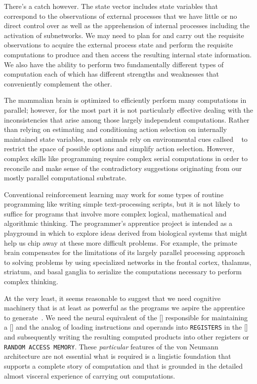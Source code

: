 There's a catch however. The state vector includes state variables that correspond to the observations of external processes that we have little or no direct control over as well as the apprehension of internal processes including the activation of subnetworks. We may need to plan for and carry out the requisite observations to acquire the external process state and perform the requisite computations to produce and then access the resulting internal state information. We also have the ability to perform two fundamentally different types of computation each of which has different strengths and weaknesses that conveniently complement the other.

The mammalian brain is optimized to efficiently perform many computations in parallel; however, for the most part it is not particularly effective dealing with the inconsistencies that arise among those largely independent computations. Rather than relying on estimating and conditioning action selection on internally maintained state variables, most animals rely on environmental cues \emdash{} callsed {}~\cite{GibsonAFFORDANCES-79} \emdash{} to restrict the space of possible options and simplify action selection. However, complex skills like programming require complex serial computations in order to reconcile and make sense of the contradictory suggestions originating from our mostly parallel computational substrate. 

Conventional reinforcement learning may work for some types of routine programming like writing simple text-processing scripts, but it is not likely to suffice for programs that involve more complex logical, mathematical and algorithmic thinking. The programmer's apprentice project is intended as a playground in which to explore ideas derived from biological systems that might help us chip away at these more difficult problems. For example, the primate brain compensates for the limitations of its largely parallel processing approach to solving problems by using specialized networks in the frontal cortex, thalamus, striatum, and basal ganglia to serialize the computations necessary to perform complex thinking. 

At the very least, it seems reasonable to suggest that we need cognitive machinery that is at least as powerful as the programs we aspire the apprentice to generate~\cite{GallistelandKing2009computational}. We need the neural equivalent of the [{}] responsible for maintaining a [{}] and the analog of loading instructions and operands into {\tt{REGISTERS}} in the [{}] and subsequently writing the resulting computed products into other registers or {\tt{RANDOM ACCESS MEMORY}}. These {\it{particular}} features of the von Neumann architecture are not essential \emdash{} what is required is a lingistic foundation that supports a complete story of computation and that is grounded in the detailed \emdash{} almost visceral \emdash{} experience of carrying out computations.

